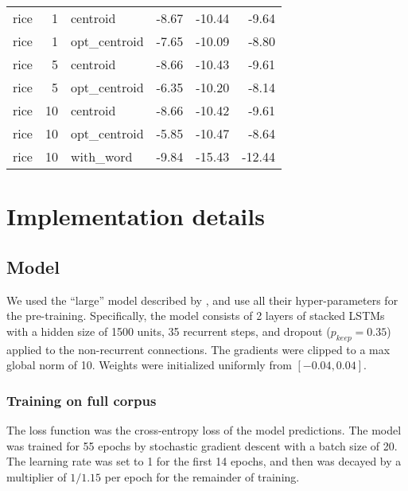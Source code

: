 \documentclass{article}
\begin{document}
\begin{table}[ht]
\begin{tabular}{lrlrrr}
  rice &   1 & centroid & -8.67 & -10.44 & -9.64 \\ 
  rice &   1 & opt\_centroid & -7.65 & -10.09 & -8.80 \\ 
  rice &   5 & centroid & -8.66 & -10.43 & -9.61 \\ 
  rice &   5 & opt\_centroid & -6.35 & -10.20 & -8.14 \\ 
  rice &  10 & centroid & -8.66 & -10.42 & -9.61 \\ 
  rice &  10 & opt\_centroid & -5.85 & -10.47 & -8.64 \\ 
  rice &  10 & with\_word & -9.84 & -15.43 & -12.44 \\ 
   \hline
\end{tabular}
\end{table}

\section{Implementation details} \label{methods_appdx}
\subsection{Model} \label{methods_appdx_model}
We used the ``large'' model described by \citet{Zaremba2014a}, and use all their hyper-parameters for the pre-training. Specifically, the model consists of 2 layers of stacked LSTMs with a hidden size of 1500 units, 35 recurrent steps, and dropout (\(p_{keep} = 0.35\)) applied to the non-recurrent connections. The gradients were clipped to a max global norm of 10. Weights were initialized uniformly from \([-0.04, 0.04]\). \par
\subsubsection{Training on full corpus}
The loss function was the cross-entropy loss of the model predictions. The model was trained for 55 epochs by stochastic gradient descent with a batch size of 20. The learning rate was set to 1 for the first 14 epochs, and then was decayed by a multiplier of \(1 / 1.15\) per epoch for the remainder of training. \par 
\end{document}
